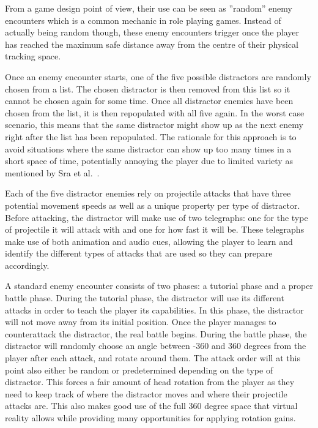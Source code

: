 From a game design point of view, their use can be seen as ''random'' enemy encounters which is a common mechanic in role playing games. Instead of actually being random though, these enemy encounters trigger once the player has reached the maximum safe distance away from the centre of their physical tracking space. 

Once an enemy encounter starts, one of the five possible distractors are randomly chosen from a list. The chosen distractor is then removed from this list so it cannot be chosen again for some time. Once all distractor enemies have been chosen from the list, it is then repopulated with all five again. In the worst case scenario, this means that the same distractor might show up as the next enemy right after the list has been repopulated. The rationale for this approach is to avoid situations where the same distractor can show up too many times in a short space of time, potentially annoying the player due to limited variety as mentioned by Sra et al.~\cite{sra2018vmotion}. 

Each of the five distractor enemies rely on projectile attacks that have three potential movement speeds as well as a unique property per type of distractor. Before attacking, the distractor will make use of two telegraphs: one for the type of projectile it will attack with and one for how fast it will be. These telegraphs make use of both animation and audio cues, allowing the player to learn and identify the different types of attacks that are used so they can prepare accordingly. 

A standard enemy encounter consists of two phases: a tutorial phase and a proper battle phase. During the tutorial phase, the distractor will use its different attacks in order to teach the player its capabilities. In this phase, the distractor will not move away from its initial position. Once the player manages to counterattack the distractor, the real battle begins. During the battle phase, the distractor will randomly choose an angle between -360 and 360 degrees from the player after each attack, and rotate around them. The attack order will at this point also either be random or predetermined depending on the type of distractor. This forces a fair amount of head rotation from the player as they need to keep track of where the distractor moves and where their projectile attacks are. This also makes good use of the full 360 degree space that virtual reality allows while providing many opportunities for applying rotation gains.    

